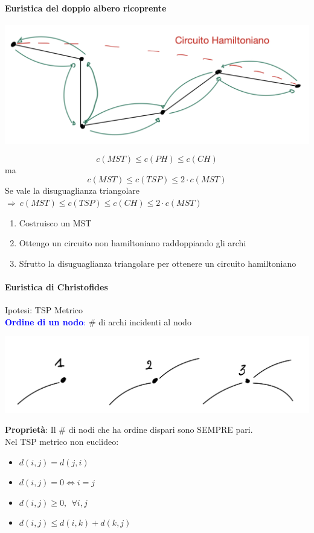\documentclass[12pt,a4paper]{article}
\begin{document}
\paragraph{Euristica del doppio albero ricoprente}
\begin{center}
\includegraphics[width=0.4\columnwidth]{img/eur_doppio_albero_ric.jpeg}
\end{center}
$$c(MST) \leq c(PH) \leq c(CH)$$
ma $$c(MST) \leq c(TSP) \leq 2\cdot c(MST)$$
Se vale la disuguaglianza triangolare $\Rightarrow \ c(MST) \leq c(TSP) \leq c(CH) \leq 2 \cdot c(MST)$
\begin{enumerate}
\item Costruisco un MST
\item Ottengo un circuito non hamiltoniano raddoppiando gli archi
\item Sfrutto la disuguaglianza triangolare per ottenere un circuito hamiltoniano
\end{enumerate}

\paragraph{Euristica di Christofides\\}
Ipotesi: TSP Metrico\\
\textcolor{blue}{\textbf{Ordine di un nodo}:} \# di archi incidenti al nodo
\begin{center}
\includegraphics[width=0.5\columnwidth]{img/ord_nodo.jpeg}
\end{center}
\textbf{Proprietà}: Il \# di nodi che ha ordine dispari sono SEMPRE pari.\\
Nel TSP metrico non euclideo:\\
\begin{itemize}
\item $d(i,j)=d(j,i)$
\item $d(i,j)=0 \Leftrightarrow i=j$
\item $d(i,j) \geq 0, \ \ \forall i,j$
\item $d(i,j) \leq d(i,k) + d(k,j)$
\end{itemize}
\end{document}
